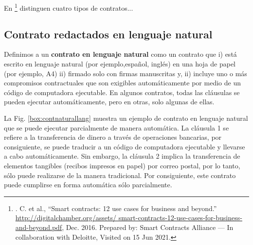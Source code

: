 \documentclass[12pt]{report} %
\begin{document}
En \footnote{. C. et al., “Smart contracts: 12 use cases for business and beyond.” \url{http://digitalchamber.org/assets/ smart-contracts-12-use-cases-for-business-and-beyond.pdf}, Dec. 2016. Prepared by: Smart Contracts Alliance — In collaboration with Deloitte, Visited on 15 Jun 2021.}  distinguen cuatro tipos de contratos...

\subsection{Contrato redactados en lenguaje natural}

Definimos a un \textbf{contrato en lenguaje natural} como un contrato que i) está escrito en lenguaje natural (por ejemplo,español, inglés) en una hoja de papel (por ejemplo, A4) ii) firmado solo con firmas manuscritas y, ii) incluye uno o más compromisos contractuales que son exigibles automáticamente por medio de un código de computadora ejecutable. En algunos contratos, todas las cláusulas se pueden ejecutar  automáticamente, pero en otras, solo algunas de ellas.


La Fig. \ref{box:contnaturallang} muestra un ejemplo de contrato en lenguaje natural que se puede ejecutar  parcialmente de manera automática. La cláusula 1 se refiere a la transferencia de dinero a través de operaciones bancarias, por consiguiente, se puede traducir a un código de computadora ejecutable y llevarse a cabo automáticamente. Sin embargo, la cláusula 2 implica la transferencia de elementos tangibles (recibos impresos en papel) por correo postal, por lo tanto, sólo puede realizarse de la manera tradicional. Por consiguiente, este contrato puede cumplirse en forma automática sólo parcialmente.
\end{document}
